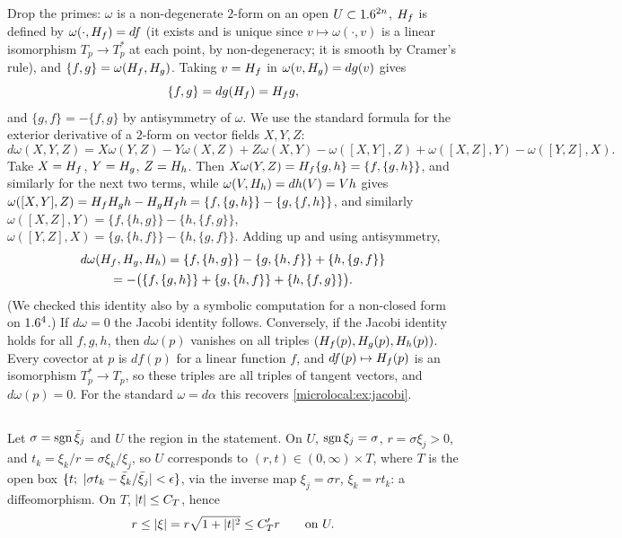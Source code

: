 \subsection*{}
Drop the primes: $\omega$ is a non-degenerate $2$-form on an open $U\subset1.6^{2n}$, $H_{f}$ is defined by
$\omega(\cdot,H_{f})=df$ (it exists and is unique since $v\mapsto\omega(\cdot,v)$ is a linear isomorphism
$T_p\to T_p^*$ at each point, by non-degeneracy; it is smooth by Cramer's rule), and
$\{f,g\}=\omega(H_{f},H_{g})$. Taking $v=H_{f}$ in $\omega(v,H_{g})=dg(v)$ gives
\begin{equation*}
  \{f,g\}=dg(H_{f})=H_{f}g,
\end{equation*}
and $\{g,f\}=-\{f,g\}$ by antisymmetry of $\omega$. We use the standard formula for the exterior
derivative of a $2$-form on vector fields $X,Y,Z$:
\begin{equation*}
  d\omega(X,Y,Z)=X\omega(Y,Z)-Y\omega(X,Z)+Z\omega(X,Y)-\omega([X,Y],Z)+\omega([X,Z],Y)-\omega([Y,Z],X).
\end{equation*}
Take $X=H_{f}$, $Y=H_{g}$, $Z=H_{h}$. Then $X\omega(Y,Z)=H_{f}\{g,h\}=\{f,\{g,h\}\}$, and similarly for the next
two terms, while $\omega(V,H_{h})=dh(V)=Vh$ gives
$\omega([X,Y],Z)=H_{f}H_{g}h-H_{g}H_{f}h=\{f,\{g,h\}\}-\{g,\{f,h\}\}$, and similarly
$\omega([X,Z],Y)=\{f,\{h,g\}\}-\{h,\{f,g\}\}$, $\omega([Y,Z],X)=\{g,\{h,f\}\}-\{h,\{g,f\}\}$. Adding up and using
antisymmetry,
\begin{multline*}
  d\omega(H_{f},H_{g},H_{h})=\{f,\{h,g\}\}-\{g,\{h,f\}\}+\{h,\{g,f\}\}\\
  =-\bigl(\{f,\{g,h\}\}+\{g,\{h,f\}\}+\{h,\{f,g\}\}\bigr).
\end{multline*}
(We checked this identity also by a symbolic computation for a non-closed form on $1.6^4$.) If
$d\omega=0$ the Jacobi identity follows. Conversely, if the Jacobi identity holds for all $f,g,h$,
then $d\omega(p)$ vanishes on all triples $(H_{f}(p),H_{g}(p),H_{h}(p))$. Every covector at $p$ is $df(p)$ for a
linear function $f$, and $df(p)\mapsto H_{f}(p)$ is an isomorphism $T^*_p\to T_p$, so these triples are all
triples of tangent vectors, and $d\omega(p)=0$. For the standard $\omega=d\alpha$ this recovers
\cref{microlocal:ex:jacobi}.

\subsection*{}
Let $\sigma=\operatorname{sgn}\bar\xi_j$ and $U$ the region in the statement. On $U$, $\operatorname{sgn}\xi_j=\sigma$, $r=\sigma\xi_j>0$, and
$t_k=\xi_k/r=\sigma\xi_k/\xi_j$, so $U$ corresponds to $(r,t)\in(0,\infty)\times T$, where $T$ is the open box
$\{t;\ \lvert \sigma t_k-\bar\xi_k/\bar\xi_j\rvert<\epsilon\}$, via the inverse map $\xi_j=\sigma r$, $\xi_k=rt_k$: a
diffeomorphism. On $T$, $\lvert t\rvert\le C_T$, hence
\begin{equation}\label{solmicrolocal:eq:r-xi}
  r\le\lvert \xi\rvert=r\sqrt{1+\lvert t\rvert^2}\le C'_Tr\qquad\text{on }U.
\end{equation}

